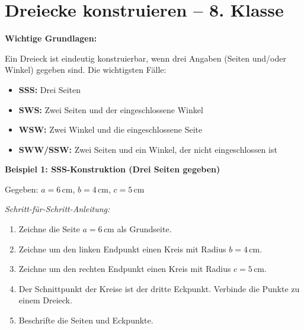 \section*{Dreiecke konstruieren – 8. Klasse}

\textbf{Wichtige Grundlagen:}

Ein Dreieck ist eindeutig konstruierbar, wenn drei Angaben (Seiten und/oder Winkel) gegeben sind. Die wichtigsten Fälle:
\begin{itemize}
    \item \textbf{SSS:} Drei Seiten
    \item \textbf{SWS:} Zwei Seiten und der eingeschlossene Winkel
    \item \textbf{WSW:} Zwei Winkel und die eingeschlossene Seite
    \item \textbf{SWW/SSW:} Zwei Seiten und ein Winkel, der nicht eingeschlossen ist
\end{itemize}

\vspace{0.5em}

\textbf{Beispiel 1: SSS-Konstruktion (Drei Seiten gegeben)}

Gegeben: $a=6\,\mathrm{cm}$, $b=4\,\mathrm{cm}$, $c=5\,\mathrm{cm}$

\textit{Schritt-für-Schritt-Anleitung:}
\begin{enumerate}
    \item Zeichne die Seite $a=6\,\mathrm{cm}$ als Grundseite.
    \item Zeichne um den linken Endpunkt einen Kreis mit Radius $b=4\,\mathrm{cm}$.
    \item Zeichne um den rechten Endpunkt einen Kreis mit Radius $c=5\,\mathrm{cm}$.
    \item Der Schnittpunkt der Kreise ist der dritte Eckpunkt. Verbinde die Punkte zu einem Dreieck.
    \item Beschrifte die Seiten und Eckpunkte.
\end{enumerate}

\begin{center}
\end{center}

